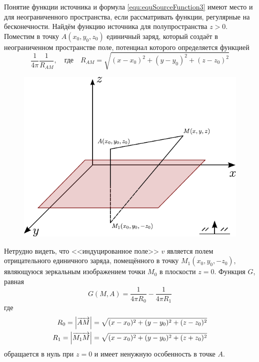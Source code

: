 Понятие функции источника и формула \eqref{equ:equSourceFunction3} имеют место и для неограниченного пространства, если рассматривать функции, регулярные на бесконечности. Найдём функцию источника для полупространства $z > 0$. Поместим в точку $A(x_0, y_0, z_0)$ единичный заряд, который создаёт в неограниченном пространстве поле, потенциал которого определяется функцией
\begin{equation}
	\frac{1}{4 \pi} \frac{1}{R_{AM}}, \quad \mbox{где} \quad R_{AM} = \sqrt{(x - x_0)^2 + (y - y_0)^2 + (z - z_0)^2}
	\label{equ:equSourceFunHalfSpat}
\end{equation}

\begin{figure}[h!]
	\centering	
	\includegraphics[scale=1]{figHalfSpatial.pdf}
\end{figure}
Нетрудно видеть, что <<индуцированное поле>> $v$  является полем отрицательного единичного заряда, помещённого в точку $M_1 (x_0, y_0, - z_0)$, являющуюся зеркальным изображением точки $M_0$ в плоскости $z = 0$. Функция $G$, равная 
\[
	G(M, A) = \frac{1}{4 \pi R_0} - \frac{1}{4 \pi R_1}
\]
где 
\begin{align}
	R_0 = \left | \overrightarrow{AM} \right | &= \sqrt{(x - x_0)^2 + (y - y_0)^2 + (z - z_0)^2}\\
	R_1 = \left | \overrightarrow{M_1M} \right | &= \sqrt{(x - x_0)^2 + (y - y_0)^2 + (z + z_0)^2}
\end{align}
обращается в нуль при $z = 0$ и имеет ненужную особенность в точке $A$.

